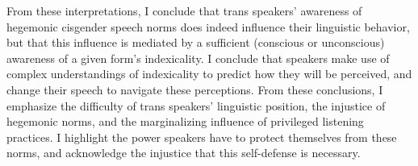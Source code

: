 \documentclass[12pt,twoside]{reedthesis}
\begin{document}
From these interpretations, I conclude that trans speakers' awareness of hegemonic cisgender speech norms does indeed influence their linguistic behavior, but that this influence is mediated by a sufficient (conscious or unconscious) awareness of a given form's indexicality. I conclude that speakers make use of complex understandings of indexicality to predict how they will be perceived, and change their speech to navigate these perceptions. From these conclusions, I emphasize the difficulty of trans speakers' linguistic position, the injustice of hegemonic norms, and the marginalizing influence of privileged listening practices. I highlight the power speakers have to protect themselves from these norms, and acknowledge the injustice that this self-defense is necessary.




	
\end{document}
